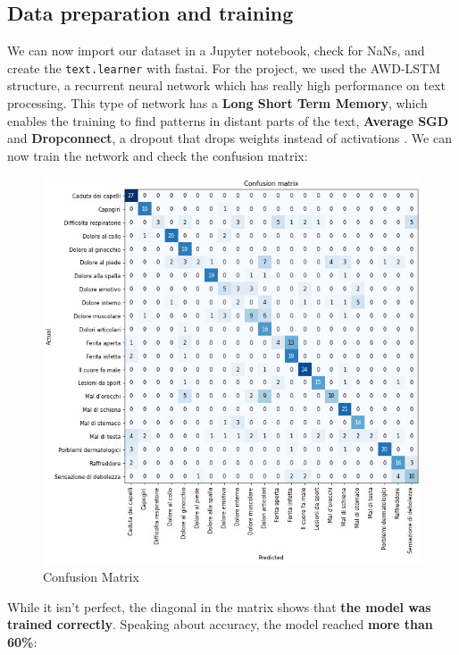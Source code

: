 \documentclass[conference]{IEEEtran}
\begin{document}
\subsection{Data preparation and training}
We can now import our dataset in a Jupyter notebook, check for NaNs, and create the \texttt{text.learner} with fastai. For the project, we used the AWD-LSTM structure, a recurrent neural network which has really high performance on text processing. This type of network has a \textbf{Long Short Term Memory}\cite{lstm}, which enables the training to find patterns in distant parts of the text, \textbf{Average SGD} and \textbf{Dropconnect}, a dropout that drops weights instead of activations \cite{awd-lstm}. We can now train the network and check the confusion matrix:
\begin{figure}[H]
    \begin{center}
        \includegraphics[width=\columnwidth]{ConfusionMatrix.jpg}
    \end{center}
    \caption{Confusion Matrix}
    \label{fig:confusion-matrix}
\end{figure}
While it isn't perfect, the diagonal in the matrix shows that \textbf{the model was trained correctly}. Speaking about accuracy, the model reached \textbf{more than 60\%}:
\end{document}
